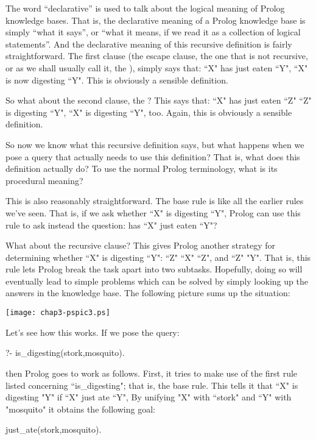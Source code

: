 The word ``declarative'' is used to talk about the logical meaning of
Prolog knowledge bases.  That is, the declarative meaning of a Prolog
knowledge base is simply ``what it says'', or ``what it means, if we read
it as a collection of logical statements''.  And the declarative
meaning of this recursive definition is fairly straightforward.  The
first clause (the escape clause, the one that is not recursive, or
as we shall usually call it, the ), simply says
that:  ``X" has just eaten ``Y",  ``X" is now
digesting ``Y".  This is obviously a sensible definition.

So what about the second clause, the ?  This
says that:  ``X" has just eaten ``Z"
 ``Z" is digesting ``Y",  ``X"
is digesting ``Y", too. Again, this is obviously a sensible
definition.

So now we know what this recursive definition says, but what happens
when we pose a query that actually needs to use this definition?  That
is, what does this definition actually do?  To use the normal Prolog
terminology, what is its procedural meaning?

This is also reasonably straightforward.  The base rule is like all
the earlier rules we've seen.  That is, if we ask whether ``X" is
digesting ``Y", Prolog can use this rule to ask instead
the question: has ``X" just eaten ``Y"?

What about the recursive clause?  This gives Prolog another strategy
for determining whether ``X" is digesting ``Y":
 ``Z"  ``X"
 ``Z", and ``Z" 
"Y".  That is, this rule lets Prolog break the task
apart into two subtasks.  Hopefully, doing so will eventually lead to
simple problems which can be solved by simply looking up the answers
in the knowledge base. The following picture sums up the situation:

\medskip

\begin{center}
\texttt{[image: chap3-pspic3.ps]}
\end{center}

Let's see how this works. If we pose the query:
\begin{LPNcodedisplay}
?- is_digesting(stork,mosquito).
\end{LPNcodedisplay}
then Prolog goes to work as follows.  First, it tries to make use of
the first rule listed concerning ``is\_digesting"; that is, the
base rule.  This tells it that ``X" is digesting
"Y" if ``X" just ate ``Y", By unifying
"X" with ``stork" and ``Y" with
"mosquito" it obtains the following goal:
\begin{LPNcodedisplay}
just_ate(stork,mosquito).
\end{LPNcodedisplay}


